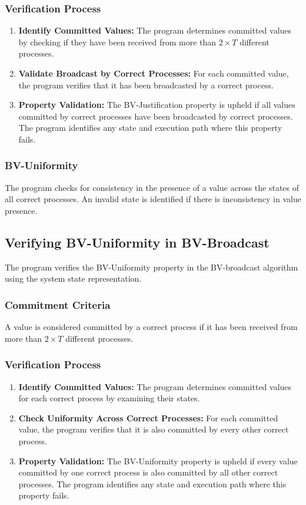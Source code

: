 \documentclass[a4paper,11pt,oneside]{report}
\begin{document}
\subsubsection{Verification Process}
\begin{enumerate}
    \item \textbf{Identify Committed Values:} The program determines committed values by checking if they have been received from more than \( 2 \times T \) different processes.
    \item \textbf{Validate Broadcast by Correct Processes:} For each committed value, the program verifies that it has been broadcasted by a correct process.
    \item \textbf{Property Validation:} The BV-Justification property is upheld if all values committed by correct processes have been broadcasted by correct processes. The program identifies any state and execution path where this property fails.
\end{enumerate}


\subsubsection{BV-Uniformity}
The program checks for consistency in the presence of a value across the states of all correct processes. An invalid state is identified if there is inconsistency in value presence.

\subsection{Verifying BV-Uniformity in BV-Broadcast}
The program verifies the BV-Uniformity property in the BV-broadcast algorithm using the system state representation.

\subsubsection{Commitment Criteria}
A value is considered committed by a correct process if it has been received from more than \( 2 \times T \) different processes.

\subsubsection{Verification Process}
\begin{enumerate}
    \item \textbf{Identify Committed Values:} The program determines committed values for each correct process by examining their states.
    \item \textbf{Check Uniformity Across Correct Processes:} For each committed value, the program verifies that it is also committed by every other correct process.
    \item \textbf{Property Validation:} The BV-Uniformity property is upheld if every value committed by one correct process is also committed by all other correct processes. The program identifies any state and execution path where this property fails.
\end{enumerate}
\end{document}

